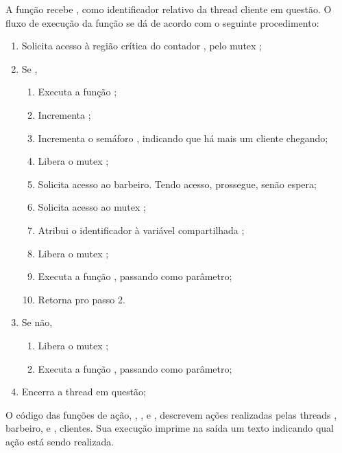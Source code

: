\documentclass[
	12pt,				%
	openright,			%
	oneside,			%
	a4paper,			%
	chapter=TITLE,		%
	english,			%
	french,				%
	spanish,			%
	brazil				%
	]{abntex2}
\theoremstyle{definition}
\begin{document}
A função  recebe , como identificador relativo da thread cliente  em questão. O fluxo de execução da função se dá de acordo com o seguinte procedimento:

\begin{enumerate}
    \item Solicita acesso à região crítica do contador , pelo mutex ;
    \item Se ,
    \begin{enumerate}
        \item Executa a função ;
        \item Incrementa ;
        \item Incrementa o semáforo , indicando que há mais um cliente chegando;
        \item Libera o mutex ;
        \item Solicita acesso ao barbeiro. Tendo acesso, prossegue, senão espera;
        \item Solicita acesso ao mutex ;
        \item Atribui o identificador  à variável compartilhada ;
        \item Libera o mutex ;
        \item Executa a função , passando  como parâmetro;
        \item Retorna pro passo 2.
    \end{enumerate}
    \item Se não,
    \begin{enumerate}
        \item Libera o mutex ;
        \item Executa a função , passando  como parâmetro;
    \end{enumerate}
    \item Encerra a thread  em questão;
\end{enumerate}

O código das funções de ação, , ,  e , descrevem ações realizadas pelas threads , barbeiro, e , clientes. Sua execução imprime na saída um texto indicando qual ação está sendo realizada. 
\end{document}
